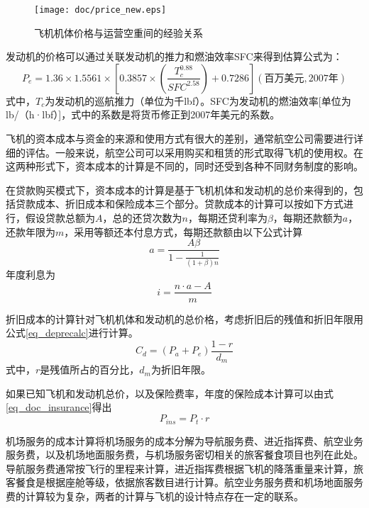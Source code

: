 \begin{figure}
\begin{center}
  \texttt{[image: doc/price\_new.eps]}
  \caption{飞机机体价格与运营空重间的经验关系}
  \label{fig_airplane_price}
\end{center}
\end{figure}

发动机的价格可以通过关联发动机的推力和燃油效率SFC来得到估算公式为：
\begin{equation}
\label{eq_engineprice}
P_e=1.36×1.5561×[0.3857×(\frac{T_{c}^{0.88}}{SFC^2.58})+0.7286]
(\mbox{百万美元},2007\mbox{年})
\end{equation}
式中，$T_{c}$为发动机的巡航推力（单位为千lbf）。SFC为发动机的燃油效率[单位为lb/（h·lbf）]，式中的系数是将货币修正到2007年美元的系数。


飞机的资本成本与资金的来源和使用方式有很大的差别，通常航空公司需要进行详细的评估。一般来说，航空公司可以采用购买和租赁的形式取得飞机的使用权。在这两种形式下，资本成本的计算是不同的，同时还受到各种不同财务制度的影响。

在贷款购买模式下，资本成本的计算是基于飞机机体和发动机的总价来得到的，包括贷款成本、折旧成本和保险成本三个部分。贷款成本的计算可以按如下方式进行，假设贷款总额为$A$，总的还贷次数为$n$，每期还贷利率为$\beta$，每期还款额为$a$，还款年限为$m$，采用等额还本付息方式，每期还款额由以下公式计算
\begin{equation}
a=\frac{A\beta}{1-\frac{1}{(1+\beta)n}}
\label{eq_captitalcost_buy}
\end{equation}
年度利息为
\begin{equation}
i=\frac{n·a-A}{m} \label{eq_captitalcost_interests}
\end{equation}

折旧成本的计算针对飞机机体和发动机的总价格，考虑折旧后的残值和折旧年限用
公式\ref{eq_deprecalc}进行计算。
\begin{equation}
C_d=(P_a+P_e)\frac{1-r}{d_m}
\label{eq_deprecalc}
\end{equation}
式中，$r$是残值所占的百分比，$d_m$为折旧年限。

如果已知飞机和发动机总价，以及保险费率，年度的保险成本计算可以由式%
\ref{eq_doc_insurance}得出
\begin{equation}
\label{eq_doc_insurance} P_{ins}=P_t·r
\end{equation}

机场服务的成本计算将机场服务的成本分解为导航服务费、进近指挥费、航空业务服务费，以及机场地面服务费，与机场服务密切相关的旅客餐食项目也列在此处。导航服务费通常按飞行的里程来计算，进近指挥费根据飞机的降落重量来计算，旅客餐食是根据座舱等级，依据旅客数目进行计算。航空业务服务费和机场地面服务费的计算较为复杂，两者的计算与飞机的设计特点存在一定的联系。

